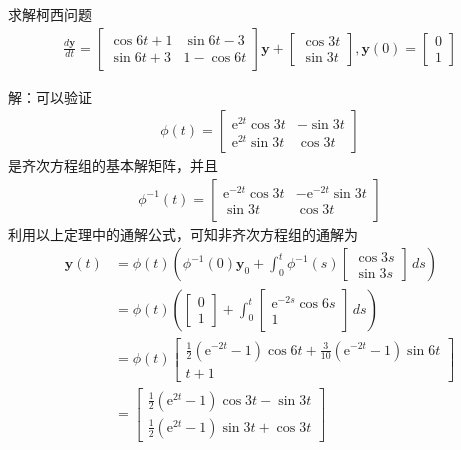 \begin{example}
    求解柯西问题\begin{align*}
    \frac{d\mathbf{y}}{dt}=\begin{bmatrix}
    \cos 6t+1 & \sin 6t-3\\
    \sin 6t+3 & 1-\cos 6t
    \end{bmatrix}\mathbf{y}+\begin{bmatrix}
        \cos 3t\\
        \sin 3t
    \end{bmatrix},\mathbf{y}(0)=\begin{bmatrix}
    0\\
    1
    \end{bmatrix}
    \end{align*}

    解：可以验证\begin{align*}
        \phi(t)=\begin{bmatrix}
        \mathrm{e}^{2t}\cos 3t & -\sin 3t\\
        \mathrm{e}^{2t}\sin 3t & \cos 3t
        \end{bmatrix}
    \end{align*}
    是齐次方程组的基本解矩阵，并且\begin{align*}
        \phi^{-1}(t)=\begin{bmatrix}
        \mathrm{e}^{-2t}\cos 3t & -\mathrm{e}^{-2t}\sin 3t\\
        \sin 3t & \cos 3t
        \end{bmatrix}
    \end{align*}
    利用以上定理中的通解公式，可知非齐次方程组的通解为\begin{align*}
    \mathbf{y}(t)&=\phi(t)\left(\phi^{-1}(0)\mathbf{y}_0+\int_{0}^t \phi^{-1}(s)\begin{bmatrix}
        \cos 3s\\
        \sin 3s
    \end{bmatrix}\,ds\right)\\
    &=\phi(t)\left(\begin{bmatrix}0\\1\end{bmatrix}+\int_{0}^t \begin{bmatrix}
        \mathrm{e}^{-2s}\cos 6s\\
        1
        \end{bmatrix}\,ds\right)\\
    &=\phi(t)\begin{bmatrix}
        \frac{1}{2}(\mathrm{e}^{-2t}-1)\cos 6t+\frac{3}{10}(\mathrm{e}^{-2t}-1)\sin 6t\\
        t+1
        \end{bmatrix}\\
    &=\begin{bmatrix}
        \frac{1}{2}(\mathrm{e}^{2t}-1)\cos 3t-\sin 3t\\
        \frac{1}{2}(\mathrm{e}^{2t}-1)\sin 3t+\cos 3t
    \end{bmatrix}
    \end{align*}
\end{example}

